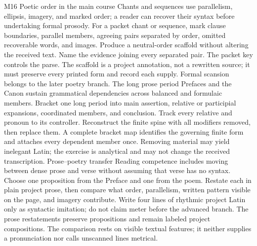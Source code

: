 \begin{courseunit}{M16}
\SubmoduleExtension
  {Poetic order in the main course}
  {Chants and sequences use parallelism, ellipsis, imagery, and marked order;
  a reader can recover their syntax before undertaking formal prosody.}
  {For a packet chant or sequence, mark clause boundaries, parallel members,
  agreeing pairs separated by order, omitted recoverable words, and images.
  Produce a neutral-order scaffold without altering the received text.}
  {Name the evidence joining every separated pair.}
  {The packet key controls the parse.  The scaffold is a project annotation,
  not a rewritten source; it must preserve every printed form and record each
  supply.  Formal scansion belongs to the later poetry branch.}
\SubmoduleExtension
  {The long prose period}
  {Prefaces and the Canon sustain grammatical dependencies across balanced and
  formulaic members.}
  {Bracket one long period into main assertion, relative or participial
  expansions, coordinated members, and conclusion.  Track every relative and
  pronoun to its controller.}
  {Reconstruct the finite spine with all modifiers removed, then replace them.}
  {A complete bracket map identifies the governing finite form and attaches
  every dependent member once.  Removing material may yield inelegant Latin;
  the exercise is analytical and may not change the received transcription.}
\SubmoduleExtension
  {Prose--poetry transfer}
  {Reading competence includes moving between dense prose and verse without
  assuming that verse has no syntax.}
  {Choose one proposition from the Preface and one from the poem.  Restate each
  in plain project prose, then compare what order, parallelism, written pattern
  visible on the page, and imagery contribute.}
  {Write four lines of rhythmic project Latin only as syntactic imitation; do
  not claim meter before the advanced branch.}
  {The prose restatements preserve propositions and remain labeled project
  compositions.  The comparison rests on visible textual features; it neither
  supplies a pronunciation nor calls unscanned lines metrical.}
\end{courseunit}

